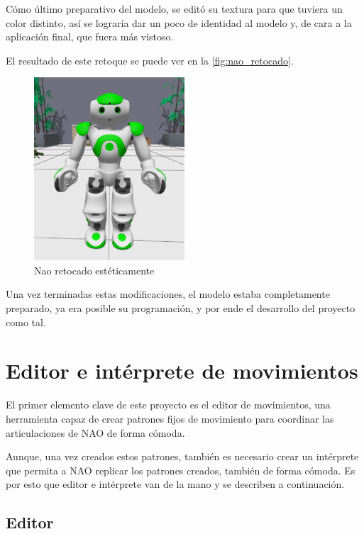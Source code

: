 Cómo último preparativo del modelo, se editó su textura para que tuviera un color distinto, así se lograría dar un poco de identidad al modelo y, de cara a la aplicación final, que fuera más vistoso.

El resultado de este retoque se puede ver en la \autoref{fig:nao_retocado}.

\begin{figure}[H]
  \centering
  \includegraphics[width=0.5\textwidth]{figures/cap_4/GreenNao.png}
  \caption{Nao retocado estéticamente}
  \label{fig:nao_retocado}
\end{figure}

Una vez terminadas estas modificaciones, el modelo estaba completamente preparado, ya era posible su programación, y por ende el desarrollo del proyecto como tal.

\section{Editor e intérprete de movimientos}

El primer elemento clave de este proyecto es el editor de movimientos, una herramienta capaz de crear patrones fijos de movimiento para coordinar las articulaciones de NAO de forma cómoda.

Aunque, una vez creados estos patrones, también es necesario crear un intérprete que permita a NAO replicar los patrones creados, también de forma cómoda. Es por esto que editor e intérprete van de la mano y se describen a continuación.

\subsection{Editor} \label{subsec:editor}

